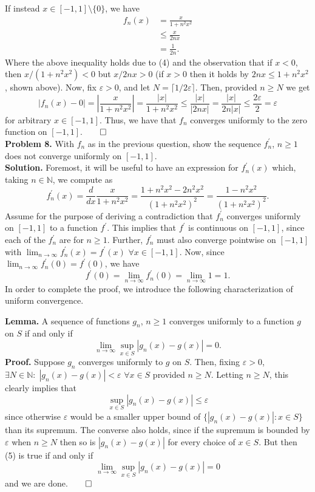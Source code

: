 \documentclass[11pt, letterpaper]{article}
\newcommand{\mbb}[1]{\mathbb{#1}}
\begin{document}
    If instead $x\in[-1,1]\setminus\{0\}$, we have
    \begin{align*}
        f_n(x)&=\frac{x}{1+n^2x^2}\\
        &\leq \frac{x}{2nx}\tag{by (4)}\\
        &=\frac{1}{2n}.
    \end{align*}
    Where the above inequality holds due to (4) and the observation that if $x<0$, then $x/(1+n^2x^2)<0$ but $x/2nx>0$ (if $x>0$ then it holds by $2nx\leq 1+n^2x^2$, shown above). Now, fix $\varepsilon>0$, and let $N=\lceil1/2\varepsilon\rceil$. Then, provided $n\geq N$ we get
    \[|f_n(x)-0|=\left|\frac{x}{1+n^2x^2}\right|=\frac{|x|}{1+n^2x^2}\leq \frac{|x|}{|2nx|}=\frac{|x|}{2n|x|}\leq \frac{2\varepsilon}{2}=\varepsilon\]
    for arbitrary $x\in[-1,1]$. Thus, we have that $f_n$ converges uniformly to the zero function on $[-1,1]$.\hfill{$\qed$}\\[10pt]
    {\bf Problem 8.} With $f_n$ as in the previous question, show the sequence $f_n^\prime$, $n\geq 1$ does not converge uniformly on $[-1,1]$.\\[10pt]
    {\bf Solution.} Foremost, it will be useful to have an expression for $f_n^\prime(x)$ which, taking $n\in\mbb{N}$, we compute as
    \[f_n^\prime(x)=\frac{d}{dx}\frac{x}{1+n^2x^2}=\frac{1+n^2x^2-2n^2x^2}{(1+n^2x^2)^2}=\frac{1-n^2x^2}{(1+n^2x^2)^2}.\]
    Assume for the purpose of deriving a contradiction that $f^\prime_n$ converges uniformly on $[-1,1]$ to a function $f^\prime$. This implies that $f^\prime$ is continuous on $[-1,1]$, since each of the 
    $f_n^\prime$ are for $n\geq 1$. Further, $f^\prime_n$ must also converge pointwise on $[-1,1]$ with
    $\lim_{n\rightarrow\infty}f^\prime_n(x)=f^\prime(x)$ $\forall x\in[-1,1]$. 
    Now, since $\lim_{n\rightarrow\infty}f^\prime_n(0)=f^\prime(0)$, we have
    \[f^\prime(0)=\lim_{n\rightarrow\infty}f^\prime_n(0)=\lim_{n\rightarrow\infty}1=1.\]
    In order to complete the proof, we introduce the following characterization of uniform convergence.\\[3pt]
    \begin{center}
        \begin{minipage}[c]{0.90\linewidth}
            {\bf Lemma.} A sequence of functions $g_n$, $n\geq 1$ converges uniformly to a function $g$ on $S$ if and only if
            \[\lim_{n\rightarrow\infty}\sup_{x\in S}|g_n(x)-g(x)|=0.\]
            {\bf Proof.} Suppose $g_n$ converges uniformly to $g$ on $S$. Then, fixing $\varepsilon>0$, $\exists N\in\mbb{N}:\;|g_n(x)-g(x)|<\varepsilon$ $\forall x\in S$ provided $n\geq N$.
            Letting $n\geq N$, this clearly implies that
            \[\sup_{x\in S}|g_n(x)-g(x)|\leq\varepsilon\tag{5}\]
            since otherwise $\varepsilon$ would be a smaller upper bound of $\{|g_n(x)-g(x)|:x\in S\}$ than its supremum. The converse also holds, since if the supremum is bounded by $\varepsilon$
            when $n\geq N$ then so is $|g_n(x)-g(x)|$ for every choice of $x\in S$. But then (5) is true if and only if
            \[\lim_{n\rightarrow\infty}\sup_{x\in S}|g_n(x)-g(x)|=0\]
            and we are done.\hfill{$\qed$} 
        \end{minipage}
    \end{center}\vspace{10pt}
\end{document}
